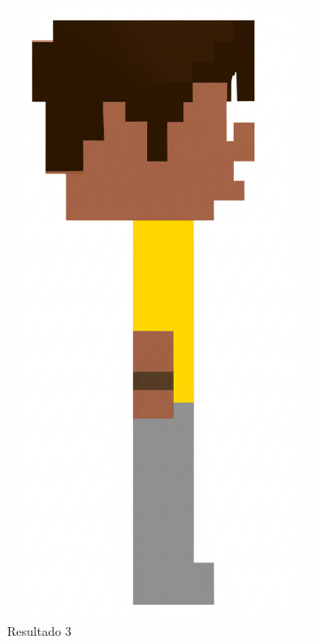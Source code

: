 \begin{figure}[htbp]
\begin{subfigure}{0.22\linewidth}
        \includegraphics[width=1\linewidth]{figs/geminiPro/chat1/res3_tela1.png}
        \caption{\small Resultado 3}
        \label{fig:geminiPro1c}
    \end{subfigure}
    \begin{subfigure}{0.22\linewidth}

\end{subfigure}
\end{figure}
